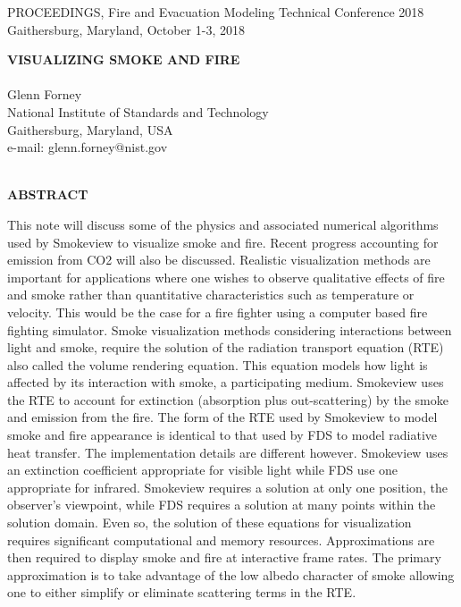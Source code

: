 \documentclass[11pt]{article}
\begin{document}



\pagestyle{plain}


\pagestyle{empty}
%
%

\newpage

PROCEEDINGS, Fire and Evacuation Modeling Technical Conference 2018 \\
Gaithersburg, Maryland, October 1-3, 2018

\begin{center}
{\bf VISUALIZING SMOKE AND FIRE} \\
\hspace{1in} \\
Glenn Forney \\
National Institute of Standards and Technology \\
Gaithersburg, Maryland, USA \\
e-mail: glenn.forney@nist.gov \\
\hspace{1in} \\
\end{center}
\begin{center}
{\bf ABSTRACT}\\
\end{center}

This note will discuss some of the physics and associated numerical algorithms used by Smokeview to visualize smoke and fire. Recent progress accounting for emission from CO2 will also be discussed.  Realistic visualization methods are important for applications where one wishes to observe qualitative effects of fire and smoke rather than quantitative characteristics such as temperature or velocity. This would be the case for a fire fighter using a computer based fire fighting simulator.  Smoke visualization methods considering interactions between light and smoke, require the solution of the radiation transport equation (RTE) also called the volume rendering equation. This equation models how light is affected by its interaction with smoke, a participating medium. Smokeview uses the RTE to account for extinction (absorption plus out-scattering) by the smoke and emission from the fire. The form of the RTE used by Smokeview to model smoke and fire appearance is identical to that used by FDS to model radiative heat transfer.  The implementation details are different however.  Smokeview uses an extinction coefficient appropriate for visible light while FDS use one appropriate for infrared. Smokeview requires a solution at only one position, the observer's viewpoint, while FDS requires a solution at many points within the solution domain. Even so, the solution of these equations for visualization requires significant computational and memory resources.  Approximations are then required to display smoke and fire at interactive frame rates. The primary approximation is to take advantage of the low albedo character of smoke allowing one to either simplify or eliminate scattering terms in the RTE.
\end{document}
